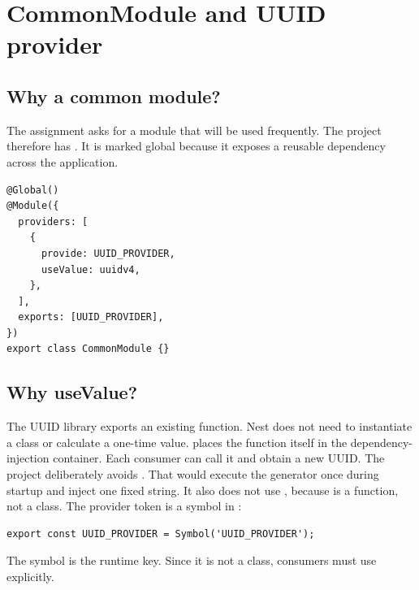 \section{CommonModule and UUID provider}
\subsection{Why a common module?}
The assignment asks for a module that will be used frequently. The project therefore has . It is marked global because it exposes a reusable dependency across the application.
\begin{lstlisting}
@Global()
@Module({
  providers: [
    {
      provide: UUID_PROVIDER,
      useValue: uuidv4,
    },
  ],
  exports: [UUID_PROVIDER],
})
export class CommonModule {}
\end{lstlisting}
\subsection{Why useValue?}
The UUID library exports an existing function. Nest does not need to instantiate a class or calculate a one-time value.  places the function itself in the dependency-injection container. Each consumer can call it and obtain a new UUID.
The project deliberately avoids . That would execute the generator once during startup and inject one fixed string. It also does not use , because  is a function, not a class.
The provider token is a symbol in :
\begin{lstlisting}
export const UUID_PROVIDER = Symbol('UUID_PROVIDER');
\end{lstlisting}
The symbol is the runtime key. Since it is not a class, consumers must use  explicitly.

